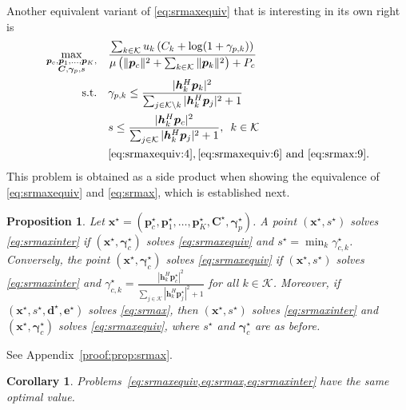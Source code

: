 \documentclass[a4paper,10pt,journal]{IEEEtran}
\let\vec\bm
\newtheorem{corollary}{Corollary}
\newtheorem{proposition}{Proposition}
\begin{document}
Another equivalent variant of \cref{eq:srmaxequiv} that is interesting in its own right is
\begin{subequations} \label{eq:srmaxinter}
	\begin{align}
		\max_{\substack{\vec p_c, \vec p_1, \dots, \vec p_K,\\ \vec C, \vec \gamma_p, s}}\quad &  \frac{\sum_{k\in\mathcal{K}} u_k \left(C_k+\log(1+ \gamma_{p,k})\right)}{\mu \left( \Vert \vec p_c \Vert^2 + \sum_{k\in\mathcal K} \Vert \vec p_k \Vert^2 \right) + P_c} \\
	\mbox{s.t.}\quad
	& \gamma_{p,k}\le \frac{|{\vec{h}}_{k}^{H}\vec{p}_{k}|^2}{\sum_{j\in\mathcal{K}\setminus k}|\vec{h}_{k}^{H}\vec{p}_{j}|^2+1} \label{eq:srmaxinter:1} \\
	& s \le \frac{|{\vec{h}}_{k}^{H}\vec{p}_{c}|^2}{\sum_{j\in\mathcal{K}}|\vec{h}_{k}^{H}\vec{p}_{j}|^2+1},\enskip k\in\mathcal K \label{eq:srmaxinter:2} \\
	& \eqref{eq:srmaxequiv:4}, \eqref{eq:srmaxequiv:6}  \text{ and } \eqref{eq:srmax:9}.
	\end{align}
\end{subequations}
This problem is obtained as a side product when showing the equivalence of \cref{eq:srmaxequiv} and \cref{eq:srmax}, which is established next.
\begin{proposition} \label{prop:srmax}
	Let $\vec x^\star = (\vec p_c^\star, \vec p_1^\star, \dots, \vec p_K^\star, \vec C^\star, \vec \gamma_p^\star)$.
	A point $(\vec x^\star, s^\star)$ solves \cref{eq:srmaxinter} if $(\vec x^\star, \vec \gamma_c^\star)$ solves \cref{eq:srmaxequiv} and $s^\star = \min_k \gamma_{c,k}^\star$.
	Conversely, the point $(\vec x^\star, \vec \gamma_c^\star)$ solves \cref{eq:srmaxequiv} if $(\vec x^\star, s^\star)$ solves \cref{eq:srmaxinter} and
	$\gamma_{c,k}^\star = \frac{|{\vec{h}}_{k}^{H}\vec{p}_{c}^\star|^2}{\sum_{j\in\mathcal{K}}|\vec{h}_{k}^{H}\vec{p}_{j}^\star|^2+1}$ for all $k\in\mathcal K$.
	Moreover, if $(\vec x^\star, s^\star, \vec d^\star, \vec e^\star)$ solves \cref{eq:srmax}, then $(\vec x^\star, s^\star)$ solves \cref{eq:srmaxinter} and $(\vec x^\star, \vec \gamma_c^\star)$ solves \cref{eq:srmaxequiv}, where $s^\star$ and $\vec\gamma_c^\star$ are as before.
\end{proposition}

\begin{IEEEproof}
	See Appendix~\ref{proof:prop:srmax}.
\end{IEEEproof}

\begin{corollary}
	Problems~\cref{eq:srmaxequiv,eq:srmax,eq:srmaxinter} have the same optimal value.
\end{corollary}
\end{document}
